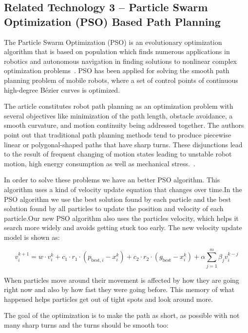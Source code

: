 \subsection{Related Technology 3 -- Particle Swarm Optimization (PSO) Based Path Planning}

The Particle Swarm Optimization (PSO) is an evolutionary optimization algorithm that is based on population which finds numerous applications in robotics and autonomous navigation in finding solutions to nonlinear complex optimization problems~\cite{krell2019collision}. PSO has been applied for solving the smooth path planning problem of mobile robots, where a set of control points of continuous high-degree Bézier curves is optimized.

The article constitutes robot path planning as an optimization problem with several objectives like minimization of the path length, obstacle avoidance, a smooth curvature, and motion continuity being addressed together. The authors point out that traditional path planning methods tend to produce piecewise linear or polygonal-shaped paths that have sharp turns. These disjunctions lead to the result of frequent changing of motion states leading to unstable robot motion, high energy consumption as well as mechanical stress.~\cite{song2020smooth}.

In order to solve these problems we have an better PSO algorithm. This algorithm uses a kind of velocity update equation that changes over time.In the PSO algorithm we use the best solution found by each particle and the best solution found by all particles to update the position and velocity of each particle.Our new PSO algorithm also uses the particles velocity, which helps it search more widely and avoids getting stuck too early.
The new velocity update model is shown as:

\begin{equation}
v_i^{k+1} = w \cdot v_i^k + c_1 \cdot r_1 \cdot (p_{\text{best},i} - x_i^k) + c_2 \cdot r_2 \cdot (g_{\text{best}} - x_i^k) + \alpha \sum_{j=1}^{m} \beta_j v_i^{k-j}
\end{equation}

When particles move around their movement is affected by how they are going right now and also by how fast they were going before. This memory of what happened helps particles get out of tight spots and look around more.

The goal of the optimization is to make the path as short, as possible with not many sharp turns and the turns should be smooth too:

